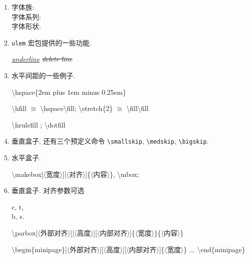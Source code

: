 \documentclass[UTF8,no-math]{ctexart}
\numberwithin{enumi}{section}
\begin{document}
\begin{enumerate}
        使用非两端对齐的段落不会断词. 使用 \texttt{ragged2e} 宏包, 使用 \verb|\RaggedRight|, \verb|\RaggedLeft|, \verb|Centering| 以及 \verb|FlushLeft|, \verb|FlushRight|, \verb|Center| 环境可以保留断词, 更为合理. 其还提供了 \verb|\justifying| 和 \verb|justify| 环境, 可以还原两端对齐. 
        \item 字体族:\\
        字体系列:\\
        字体形状:
        \item \texttt{ulem} 宏包提供的一些功能.\par  
        {\itshape \uline{underline}   \sout{delete line}   }
        \item 水平间距的一些例子. \par
        {\ttfamily \textbackslash hspace\{2em plus 1em minus 0.25em\}\par 
            \textbackslash hfill $\cong$ \textbackslash hspace{\textbackslash fill}; \textbackslash stretch\{2\} $\cong$ \textbackslash fill\textbackslash fill \par 
            \textbackslash hrulefill \hrulefill; \textbackslash dotfill \dotfill }
        \item 垂直盒子, 还有三个预定义命令 \verb|\smallskip|, \verb|\medskip|, \verb|\bigskip|. 
        \item 水平盒子. \par 
        {\ttfamily \CJKsetecglue{}\textbackslash makebox[$\langle$宽度$\rangle$][$\langle$对齐$\rangle$]\{$\langle$内容$\rangle$\}, \textbackslash mbox;  }
        \item 垂直盒子. 对齐参数可选 {\parbox[c][2em]{1.5em}{c, t,\\[-5pt]b, s.}} \par
        {\ttfamily\CJKsetecglue{}\textbackslash parbox[$\langle$外部对齐$\rangle$][$\langle$高度$\rangle$][$\langle$内部对齐$\rangle$]\{$\langle$宽度$\rangle$\}\{$\langle$内容$\rangle$\}\par
        \textbackslash begin\{minipage\}[$\langle$外部对齐$\rangle$][$\langle$高度$\rangle$][$\langle$内部对齐$\rangle$]\{$\langle$宽度$\rangle$\} $\ldots$ \textbackslash end\{minipage\}}

\end{enumerate}
\end{document}
